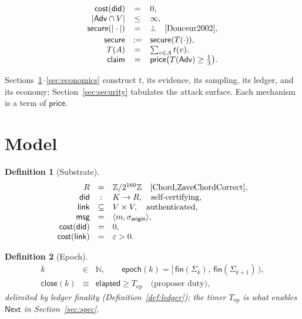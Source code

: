 \documentclass[11pt,letterpaper]{article}
\newtheorem{definition}{Definition}
\begin{document}
\[
\begin{array}{rcl}
\mathsf{cost}(\mathsf{did})&=&0,\\
|\mathsf{Adv}\cap V|&\leq&\infty,\\
\mathsf{secure}(|\cdot|)&=&\bot\quad\text{\cite{Douceur2002}},\\[2pt]
\mathsf{secure}&:=&\mathsf{secure}(T(\cdot)),\\
T(A)&=&\textstyle\sum_{v\in A}t(v),\\
\mathsf{claim}&=&\mathsf{price}\bigl(T(\mathsf{Adv})\geq\tfrac13\bigr).
\end{array}
\]

Sections~\ref{sec:model}--\ref{sec:economics} construct $t$, its evidence,
its sampling, its ledger, and its economy; Section~\ref{sec:security}
tabulates the attack surface.  Each mechanism is a term of
$\mathsf{price}$.

\section{Model}\label{sec:model}

\begin{definition}[Substrate]\label{def:substrate}
\[
\begin{array}{rcl}
R&=&\mathbb{Z}/2^{160}\mathbb{Z}\quad\text{\cite{Chord,ZaveChordCorrect}},\\
\mathsf{did}&:&K\to R,\quad\text{self-certifying},\\
\mathsf{link}&\subseteq&V\times V,\quad\text{authenticated},\\
\mathsf{msg}&=&\langle m,\sigma_{\mathsf{origin}}\rangle,\\
\mathsf{cost}(\mathsf{did})&=&0,\\
\mathsf{cost}(\mathsf{link})&=&\varepsilon>0.
\end{array}
\]
\end{definition}

\begin{definition}[Epoch]\label{def:epoch}
\[
\begin{array}{rcl}
k&\in&\mathbb{N},\qquad
\mathsf{epoch}(k)=[\,\mathsf{fin}(\Sigma_k),\ \mathsf{fin}(\Sigma_{k+1})\,),\\
\mathsf{close}(k)&\equiv&
  \mathsf{elapsed}\geq T_{\mathrm{ep}}
  \quad\text{(proposer duty)},
\end{array}
\]
delimited by ledger finality (Definition~\ref{def:ledger}); the timer
$T_{\mathrm{ep}}$ is what enables $\mathsf{Next}$ in
Section~\ref{sec:spec}.
\end{definition}
\end{document}
